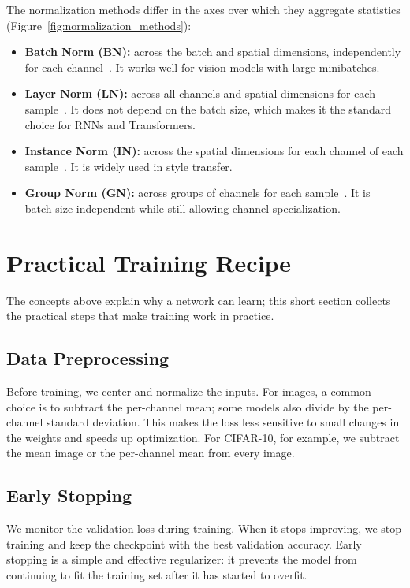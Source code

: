 The normalization methods differ in the axes over which they aggregate statistics (Figure~\ref{fig:normalization_methods}):
\begin{itemize}[nosep, leftmargin=*]
    \item \textbf{Batch Norm (BN):} across the batch and spatial dimensions, independently for each channel~\cite{ioffe2015batch}. It works well for vision models with large minibatches.
    \item \textbf{Layer Norm (LN):} across all channels and spatial dimensions for each sample~\cite{ba2016layer}. It does not depend on the batch size, which makes it the standard choice for RNNs and Transformers.
    \item \textbf{Instance Norm (IN):} across the spatial dimensions for each channel of each sample~\cite{ulyanov2016instance}. It is widely used in style transfer.
    \item \textbf{Group Norm (GN):} across groups of channels for each sample~\cite{wu2018group}. It is batch-size independent while still allowing channel specialization.
\end{itemize}

\section{Practical Training Recipe}

The concepts above explain why a network can learn; this short section collects the practical steps that make training work in practice.

\subsection{Data Preprocessing}
Before training, we center and normalize the inputs. For images, a common choice is to subtract the per-channel mean; some models also divide by the per-channel standard deviation. This makes the loss less sensitive to small changes in the weights and speeds up optimization. For CIFAR-10, for example, we subtract the mean image or the per-channel mean from every image.

\subsection{Early Stopping}
We monitor the validation loss during training. When it stops improving, we stop training and keep the checkpoint with the best validation accuracy. Early stopping is a simple and effective regularizer: it prevents the model from continuing to fit the training set after it has started to overfit.

